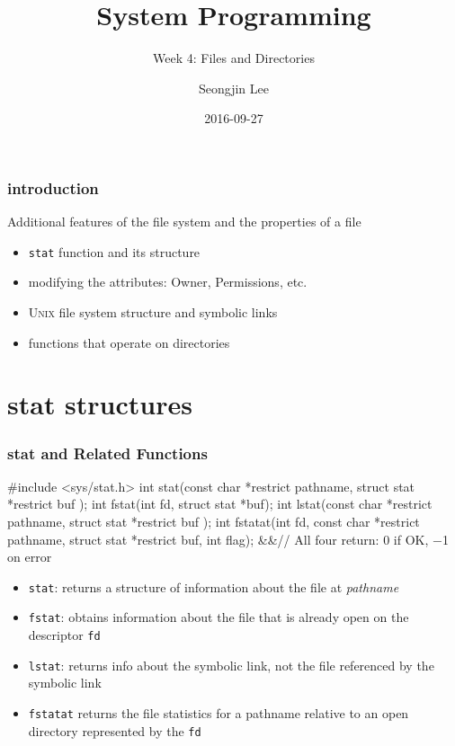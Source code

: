 \documentclass[newPxFont,sthlmFooter,nooffset]{beamer}
\title{System Programming}
\subtitle{Week 4: Files and Directories}
\author[SJL]{Seongjin Lee}
\institute{\href{mailto:insight@hanyang.ac.kr}{insight@hanyang.ac.kr}\\\url{http://esos.hanyang.ac.kr}\\Esos Lab. Hanyang University}
\date{2016-09-27}
\begin{document}
\frame[plain]{\titlepage} 




\begin{frame}[t]
  \frametitle{introduction}
Additional features of the file system and the properties of a file
\begin{itemize}
\item \texttt{stat} function and its structure
\item modifying the attributes: Owner, Permissions, etc.
\item \textsc{Unix} file system structure and symbolic links
\item functions that operate on directories
\end{itemize}
\end{frame}

\section{stat structures}

\begin{frame}[containsverbatim,t]
  \frametitle{stat and Related Functions}
\begin{codedef}
#include <sys/stat.h>
int stat(const char *restrict pathname, struct stat *restrict buf );
int fstat(int fd, struct stat *buf);
int lstat(const char *restrict pathname, struct stat *restrict buf );
int fstatat(int fd, const char *restrict pathname, struct stat *restrict buf, int flag);
&&\hfill // All four return: 0 if OK, −1 on error 
\end{codedef}
\begin{itemize}
\item \texttt{stat}: returns a structure of information about the file
  at \textit{pathname}

\item \texttt{fstat}: obtains information about the file that is already
  open on the descriptor \texttt{fd}

\item \texttt{lstat}: returns info about the symbolic link, not the file
  referenced by the symbolic link

\item \texttt{fstatat} returns the file statistics for a pathname relative
  to an open directory represented by the \texttt{fd}
\end{itemize}
\end{frame}
\end{document}
